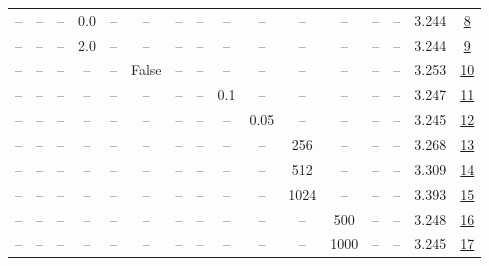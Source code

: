 \begin{table}[H]
\begin{tabular}{cccccccccccccccc}
-- & -- & -- & 0.0 & -- & -- & -- & -- & -- & -- & -- & -- & -- & -- & 3.244 & \href{https://wandb.ai/marin-community/optimizer-scaling/runs/sweep-300m-6B-kronedc5a1lr0.001-wd0.5-b10.95-plr0.2-pis1-gn0.0-n-736741}{8} \\
-- & -- & -- & 2.0 & -- & -- & -- & -- & -- & -- & -- & -- & -- & -- & 3.244 & \href{https://wandb.ai/marin-community/optimizer-scaling/runs/sweep-300m-6B-krona55554lr0.001-wd0.5-b10.95-plr0.2-pis1-gn2.0-n-2b58f3}{9} \\
-- & -- & -- & -- & -- & False & -- & -- & -- & -- & -- & -- & -- & -- & 3.253 & \href{https://wandb.ai/marin-community/optimizer-scaling/runs/sweep-300m-6B-kronbd9170lr0.001-wd0.5-b10.95-plr0.2-pis1-gn1-nor-0add5a}{10} \\
-- & -- & -- & -- & -- & -- & -- & -- & 0.1 & -- & -- & -- & -- & -- & 3.247 & \href{https://wandb.ai/marin-community/optimizer-scaling/runs/sweep-300m-6B-kron2dfba4lr0.001-wd0.5-b10.95-plr0.1-pis1-gn1-nor-276c3b}{11} \\
-- & -- & -- & -- & -- & -- & -- & -- & -- & 0.05 & -- & -- & -- & -- & 3.245 & \href{https://wandb.ai/marin-community/optimizer-scaling/runs/sweep-300m-6B-kron79a66dlr0.001-wd0.5-b10.95-plr0.2-pis1-gn1-nor-11f4a3}{12} \\
-- & -- & -- & -- & -- & -- & -- & -- & -- & -- & 256 & -- & -- & -- & 3.268 & \href{https://wandb.ai/marin-community/optimizer-scaling/runs/sweep-300m-6B-kron3e44e0lr0.001-wd0.5-b10.95-plr0.2-pis1-gn1-nor-e9e4f3}{13} \\
-- & -- & -- & -- & -- & -- & -- & -- & -- & -- & 512 & -- & -- & -- & 3.309 & \href{https://wandb.ai/marin-community/optimizer-scaling/runs/sweep-300m-6B-krond7d67alr0.001-wd0.5-b10.95-plr0.2-pis1-gn1-nor-85324c}{14} \\
-- & -- & -- & -- & -- & -- & -- & -- & -- & -- & 1024 & -- & -- & -- & 3.393 & \href{https://wandb.ai/marin-community/optimizer-scaling/runs/sweep-300m-6B-kron8b18a1lr0.001-wd0.5-b10.95-plr0.2-pis1-gn1-nor-4605e0}{15} \\
-- & -- & -- & -- & -- & -- & -- & -- & -- & -- & -- & 500 & -- & -- & 3.248 & \href{https://wandb.ai/marin-community/optimizer-scaling/runs/sweep-300m-6B-krondc1418lr0.001-wd0.5-b10.95-plr0.2-pis1-gn1-nor-f0e290}{16} \\
-- & -- & -- & -- & -- & -- & -- & -- & -- & -- & -- & 1000 & -- & -- & 3.245 & \href{https://wandb.ai/marin-community/optimizer-scaling/runs/sweep-300m-6B-krona5b2cclr0.001-wd0.5-b10.95-plr0.2-pis1-gn1-nor-c5851e}{17} \\

\end{tabular}
\end{table}
